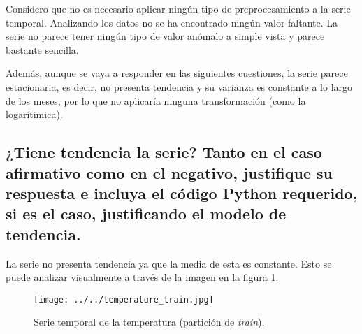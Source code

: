 \documentclass[12pt,letterpaper]{article}
\begin{document}
Considero que no es necesario aplicar ningún tipo de preprocesamiento a la serie temporal. Analizando los datos no se ha encontrado ningún valor faltante. La serie no parece tener ningún tipo de valor anómalo a simple vista y parece bastante sencilla.

Además, aunque se vaya a responder en las siguientes cuestiones, la serie parece estacionaria, es decir, no presenta tendencia y su varianza es constante a lo largo de los meses, por lo que no aplicaría ninguna transformación (como la logarítimica).

\subsection{¿Tiene tendencia la serie? Tanto en el caso afirmativo como en el negativo,
justifique su respuesta e incluya el código Python requerido, si es el caso,
justificando el modelo de tendencia.}

La serie no presenta tendencia ya que la media de esta es constante. Esto se puede analizar visualmente a través de la imagen en la figura \ref{fig:temperature_ts}.

\begin{figure}[htp]
    \centering
    \texttt{[image: ../../temperature\_train.jpg]}
    \caption{Serie temporal de la temperatura (partición de \textit{train}).}
    \label{fig:temperature_ts}
\end{figure}
\end{document}
